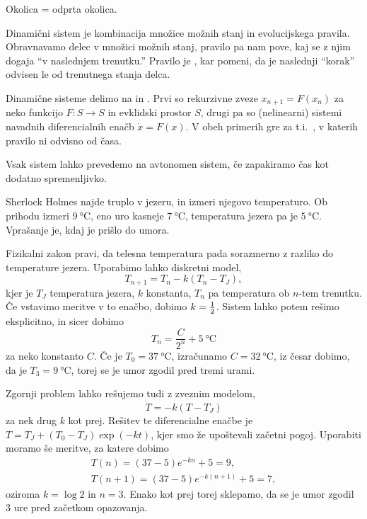 \begin{opomba}
  Okolica = odprta okolica.
\end{opomba}


Dinamični sistem je kombinacija množice možnih stanj in evolucijskega pravila.
Obravnavamo delec v množici možnih stanj, pravilo pa nam pove, kaj se z njim
dogaja \enquote{v naslednjem trenutku.}
Pravilo je , kar pomeni, da je naslednji \enquote{korak}
odvisen le od trenutnega stanja delca.

Dinamične sisteme delimo na  in .
Prvi so rekurzivne zveze $x_{n+1} = F(x_n)$ za neko funkcijo $F: S \to S$ in
evklidski prostor $S$, drugi pa so (nelinearni) sistemi navadnih diferencialnih
enačb $\dot{x} = F(x)$.
V obeh primerih gre za t.i.~, v katerih pravilo ni
odvisno od časa.

\begin{opomba}
  Vsak sistem lahko prevedemo na avtonomen sistem, če zapakiramo čas kot dodatno
  spremenljivko.
\end{opomba}

\begin{primer}
  Sherlock Holmes najde truplo v jezeru, in izmeri njegovo temperaturo.
  Ob prihodu izmeri $\qty{9}{\celsius}$, eno uro kasneje $\qty{7}{\celsius}$,
  temperatura jezera pa je $\qty{5}{\celsius}$.
  Vprašanje je, kdaj je prišlo do umora.

  Fizikalni zakon pravi, da telesna temperatura pada sorazmerno z razliko do
  temperature jezera.
  Uporabimo lahko diskretni model,
  \[
	T_{n+1} = T_n - k (T_n - T_J),
  \]
  kjer je $T_J$ temperatura jezera, $k$ konstanta, $T_n$ pa temperatura ob
  $n$-tem trenutku.
  Če vstavimo meritve v to enačbo, dobimo $k = \frac{1}{2}$.
  Sistem lahko potem rešimo eksplicitno, in sicer dobimo
  \[
	T_n = \frac{C}{2^n} + \qty{5}{\celsius}
  \]
  za neko konstanto $C$.
  Če je $T_0 = \qty{37}{\celsius}$, izračunamo $C = \qty{32}{\celsius}$, iz
  česar dobimo, da je $T_3 = \qty{9}{\celsius}$, torej se je umor zgodil pred
  tremi urami.
  \boxdot{}
\end{primer}

\begin{primer}
  Zgornji problem lahko rešujemo tudi z zveznim modelom,
  \[
	\dot{T} = -k (T - T_J)
  \]
  za nek drug $k$ kot prej.
  Rešitev te diferencialne enačbe je $T = T_J + (T_0 - T_J) \exp(-kt)$, kjer smo
  že upoštevali začetni pogoj.
  Uporabiti moramo še meritve, za katere dobimo
  \begin{gather*}
	T(n) = (37 - 5) e^{-kn} + 5 = 9, \\
	T(n+1) = (37 - 5) e^{-k(n+1)} + 5 = 7,
  \end{gather*}
  oziroma $k = \log 2$ in $n = 3$.
  Enako kot prej torej sklepamo, da se je umor zgodil $3$ ure pred začetkom
  opazovanja.
  \boxdot{}
\end{primer}
